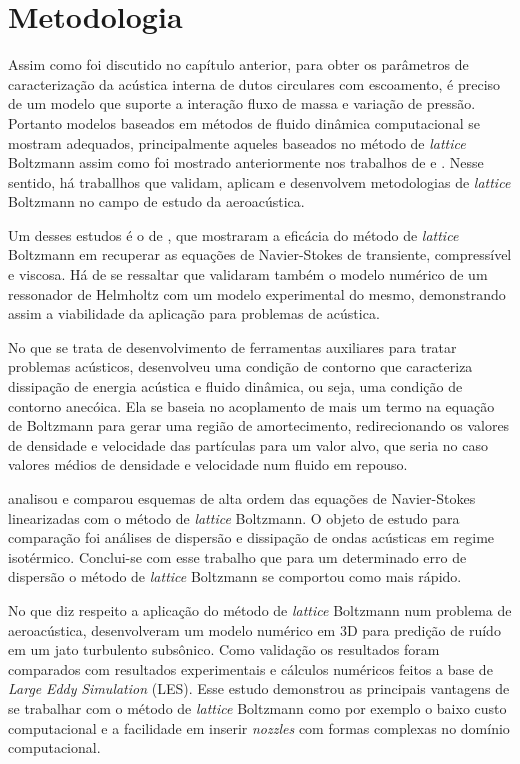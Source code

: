 \chapter{Metodologia}

Assim como foi discutido no capítulo anterior, para obter os parâmetros de caracterização da acústica interna de dutos circulares com escoamento, é preciso de um modelo que suporte a interação fluxo de massa e variação de pressão. Portanto modelos baseados em métodos de fluido dinâmica computacional se mostram adequados, principalmente aqueles baseados no método de \textit{lattice} Boltzmann assim como foi mostrado anteriormente nos trabalhos de  e . Nesse sentido, há traballhos que validam, aplicam e desenvolvem metodologias de \textit{lattice} Boltzmann no campo de estudo da aeroacústica.

Um desses estudos é o de , que mostraram a eficácia do método de \textit{lattice} Boltzmann em recuperar as equações de Navier-Stokes de transiente, compressível e viscosa. Há de se ressaltar que validaram também o modelo numérico de um ressonador de Helmholtz com um modelo experimental do mesmo, demonstrando assim a viabilidade da aplicação para problemas de acústica.

No que se trata de desenvolvimento de ferramentas auxiliares para tratar problemas acústicos,  desenvolveu uma condição de contorno que caracteriza dissipação de energia acústica e fluido dinâmica, ou seja, uma condição de contorno anecóica. Ela se baseia no acoplamento de mais um termo na equação de Boltzmann para gerar uma região de amortecimento, redirecionando os valores de densidade e velocidade das partículas para um valor alvo, que seria no caso valores médios de densidade e velocidade num fluido em repouso.

 analisou e comparou esquemas de alta ordem das equações de Navier-Stokes linearizadas com o método de \textit{lattice} Boltzmann. O objeto de estudo para comparação foi análises de dispersão e dissipação de ondas acústicas em regime isotérmico. Conclui-se com esse trabalho que para um determinado erro de dispersão o método de \textit{lattice} Boltzmann se comportou como mais rápido.

No que diz respeito a aplicação do método de \textit{lattice} Boltzmann num problema de aeroacústica,  desenvolveram um modelo numérico em 3D para predição de ruído em um jato turbulento subsônico. Como validação os resultados foram comparados com resultados experimentais e cálculos numéricos feitos a base de \textit{Large} \textit{Eddy} \textit{Simulation} (LES). Esse estudo demonstrou as principais vantagens de se trabalhar com o método de \textit{lattice} Boltzmann como por exemplo o baixo custo computacional e a facilidade em inserir \textit{nozzles} com formas complexas no domínio computacional.

